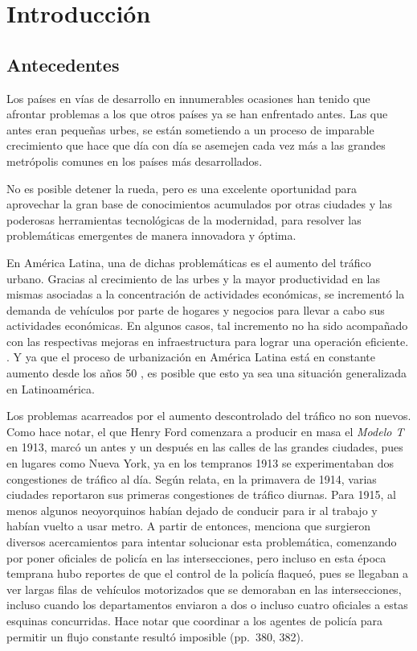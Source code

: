 
\chapter{Introducción} %
\graphicspath{{../imagenes/}}
\linespread{1.3}
\hypertarget{antecedentes}{%
\section{Antecedentes}\label{antecedentes}}

Los países en vías de desarrollo en innumerables ocasiones han tenido
que afrontar problemas a los que otros países ya se han enfrentado
antes. Las que antes eran pequeñas urbes, se están sometiendo a un
proceso de imparable crecimiento que hace que día con día se asemejen
cada vez más a las grandes metrópolis comunes en los países más
desarrollados.

No es posible detener la rueda, pero es una excelente oportunidad para
aprovechar la gran base de conocimientos acumulados por otras ciudades y
las poderosas herramientas tecnológicas de la modernidad, para resolver
las problemáticas emergentes de manera innovadora y óptima.

En América Latina, una de dichas problemáticas es el aumento del tráfico
urbano. Gracias al crecimiento de las urbes y la mayor productividad en
las mismas asociadas a la concentración de actividades económicas, se
incrementó la demanda de vehículos por parte de hogares y negocios para
llevar a cabo sus actividades económicas. En algunos casos, tal
incremento no ha sido acompañado con las respectivas mejoras en
infraestructura para lograr una operación eficiente.
\parencite[1]{Medina-Durango2011}. Y ya que el proceso de urbanización
en América Latina está en constante aumento desde los años 50
\parencite[27]{PdaCunha2009}, es posible que esto ya sea una situación
generalizada en Latinoamérica.

Los problemas acarreados por el aumento descontrolado del tráfico no son
nuevos. Como \textcite{McShane1999} hace notar, el que Henry Ford
comenzara a producir en masa el \emph{Modelo T} en 1913, marcó un antes
y un después en las calles de las grandes ciudades, pues en lugares como
Nueva York, ya en los tempranos 1913 se experimentaban dos congestiones
de tráfico al día. Según relata, en la primavera de 1914, varias
ciudades reportaron sus primeras congestiones de tráfico diurnas. Para
1915, al menos algunos neoyorquinos habían dejado de conducir para ir al
trabajo y habían vuelto a usar metro. A partir de entonces, menciona que
surgieron diversos acercamientos para intentar solucionar esta
problemática, comenzando por poner oficiales de policía en las
intersecciones, pero incluso en esta época temprana hubo reportes de que
el control de la policía flaqueó, pues se llegaban a ver largas filas de
vehículos motorizados que se demoraban en las intersecciones, incluso
cuando los departamentos enviaron a dos o incluso cuatro oficiales a
estas esquinas concurridas. Hace notar que coordinar a los agentes de
policía para permitir un flujo constante resultó imposible (pp.~380,
382).

